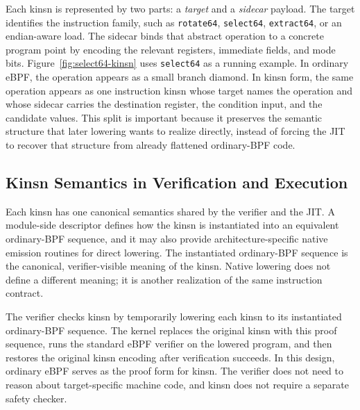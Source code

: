 Each kinsn is represented by two parts: a \emph{target} and a \emph{sidecar} payload. The target identifies the instruction family, such as \texttt{rotate64}, \texttt{select64}, \texttt{extract64}, or an endian-aware load. The sidecar binds that abstract operation to a concrete program point by encoding the relevant registers, immediate fields, and mode bits. Figure~\ref{fig:select64-kinsn} uses \texttt{select64} as a running example. In ordinary eBPF, the operation appears as a small branch diamond. In kinsn form, the same operation appears as one instruction kinsn whose target names the operation and whose sidecar carries the destination register, the condition input, and the candidate values. This split is important because it preserves the semantic structure that later lowering wants to realize directly, instead of forcing the JIT to recover that structure from already flattened ordinary-BPF code.

\subsection{Kinsn Semantics in Verification and Execution}
\label{subsec:kinsn-semantics}

Each kinsn has one canonical semantics shared by the verifier and the JIT. A module-side descriptor defines how the kinsn is instantiated into an equivalent ordinary-BPF sequence, and it may also provide architecture-specific native emission routines for direct lowering. The instantiated ordinary-BPF sequence is the canonical, verifier-visible meaning of the kinsn. Native lowering does not define a different meaning; it is another realization of the same instruction contract.

The verifier checks kinsn by temporarily lowering each kinsn to its instantiated ordinary-BPF sequence. The kernel replaces the original kinsn with this proof sequence, runs the standard eBPF verifier on the lowered program, and then restores the original kinsn encoding after verification succeeds. In this design, ordinary eBPF serves as the proof form for kinsn. The verifier does not need to reason about target-specific machine code, and kinsn does not require a separate safety checker.

